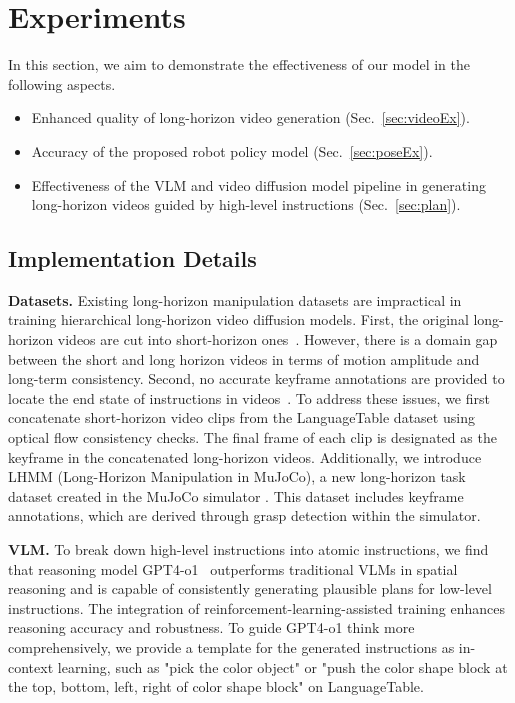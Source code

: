 \documentclass[letterpaper, 10 pt, conference]{ieeeconf}  %
\begin{document}
\section{Experiments}
In this section, we aim to demonstrate the effectiveness of our model in the following aspects.
\begin{itemize}
    \item Enhanced quality of long-horizon video generation (Sec.~\ref{sec:videoEx}).
    \item Accuracy of the proposed robot policy model (Sec.~\ref{sec:poseEx}).
    \item Effectiveness of the VLM and video diffusion model pipeline in generating long-horizon videos guided by high-level instructions (Sec.~\ref{sec:plan}).
\end{itemize}




\subsection{Implementation Details}

\noindent\textbf{Datasets.} Existing long-horizon manipulation datasets are impractical in training hierarchical long-horizon video diffusion models. First, the original long-horizon videos are cut into short-horizon ones~\cite{languagetable,robovqa}. However, there is a domain gap between the short and long horizon videos in terms of motion amplitude and long-term consistency. Second, no accurate keyframe annotations are provided to locate the end state of instructions in videos~\cite{vlabench,LHManip,calvin,lohoraven}. 
To address these issues, we first concatenate short-horizon video clips from the LanguageTable dataset \cite{languagetable} using optical flow consistency checks. The final frame of each clip is designated as the keyframe in the concatenated long-horizon videos. Additionally, we introduce LHMM (Long-Horizon Manipulation in MuJoCo), a new long-horizon task dataset created in the MuJoCo simulator \cite{mujoco}. This dataset includes keyframe annotations, which are derived through grasp detection within the simulator.

\noindent\textbf{VLM.} To break down high-level instructions into atomic instructions, we find that reasoning model GPT4-o1~\cite{gpt4o1} outperforms traditional VLMs in spatial reasoning and is capable of consistently generating plausible plans for low-level instructions. The integration of reinforcement-learning-assisted training enhances reasoning accuracy and robustness. To guide GPT4-o1 think more comprehensively, we provide a template for the generated instructions as in-context learning, such as "pick the {color} {object}" or "push the {color} {shape} block at the {top, bottom, left, right} of {color} {shape} block" on LanguageTable.
\end{document}
